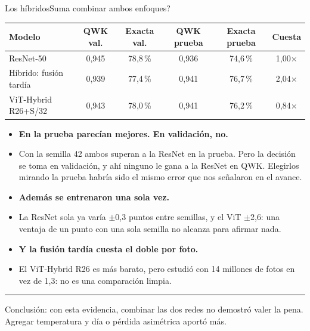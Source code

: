 \documentclass[aspectratio=169,11pt,table]{beamer}
\newcommand{\cierre}[1]{%
  \vfill
  {\color{verdecla}\rule{2.5pt}{0.9em}}\hspace{0.4em}%
  {\footnotesize\color{grisSuave}#1}%
}
\begin{document}
\begin{frame}{Los híbridos}{\textquestiondown{}Suma combinar ambos enfoques?}
{\scriptsize
\centering
\begin{tabular}{lccccc}
\toprule
\rowcolor{verdeosc}\color{white}\bfseries Modelo & \color{white}\bfseries QWK val. & \color{white}\bfseries Exacta val. & \color{white}\bfseries QWK prueba & \color{white}\bfseries Exacta prueba & \color{white}\bfseries Cuesta \\
\midrule
ResNet-50 & 0{,}945 & 78{,}8\,\% & 0{,}936 & 74{,}6\,\% & 1{,}00$\times$ \\
Híbrido: fusión tardía & 0{,}939 & 77{,}4\,\% & 0{,}941 & 76{,}7\,\% & 2{,}04$\times$ \\
ViT-Hybrid R26+S/32 & 0{,}943 & 78{,}0\,\% & 0{,}941 & 76{,}2\,\% & 0{,}84$\times$ \\
\bottomrule
\end{tabular}
}
\vspace{0.5em}
{\tiny
\setlength{\itemsep}{0.2em}
\begin{itemize}
  \item {\bfseries En la prueba parecían mejores. En validación, no.}
  \item Con la semilla 42 ambos superan a la ResNet en la prueba. Pero la decisión se toma en validación, y ahí ninguno le gana a la ResNet en QWK. Elegirlos mirando la prueba habría sido el mismo error que nos señalaron en el avance.
  \item {\bfseries Además se entrenaron una sola vez.}
  \item La ResNet sola ya varía $\pm$0{,}3 puntos entre semillas, y el ViT $\pm$2{,}6: una ventaja de un punto con una sola semilla no alcanza para afirmar nada.
  \item {\bfseries Y la fusión tardía cuesta el doble por foto.}
  \item El ViT-Hybrid R26 es más barato, pero estudió con 14 millones de fotos en vez de 1,3: no es una comparación limpia.
\end{itemize}
}
\cierre{Conclusión: con esta evidencia, combinar las dos redes no demostró valer la pena. Agregar temperatura y día o pérdida asimétrica aportó más.}
\end{frame}
\end{document}
